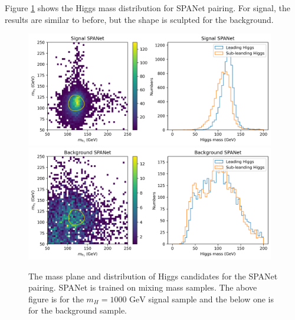 \documentclass[12pt]{article}
\begin{document}
		Figure \ref{fig:Higgs_mass_new_mix_SPANET} shows the Higgs mass distribution for SPANet pairing. For signal, the results are similar to before, but the shape is sculpted for the background.
		\begin{figure}[htpb]
			\centering
			\includegraphics[width=0.97\textwidth]{Higgs_mass_res_mix_SPANET_s.png}
			\includegraphics[width=0.97\textwidth]{Higgs_mass_res_mix_SPANET_4b.png}
			\caption{The mass plane and distribution of Higgs candidates for the SPANet pairing. SPANet is trained on mixing mass samples. The above figure is for the $m_H = \text{1000 GeV}$ signal sample and the below one is for the background sample.}
			\label{fig:Higgs_mass_new_mix_SPANET}
		\end{figure}


\end{document}
